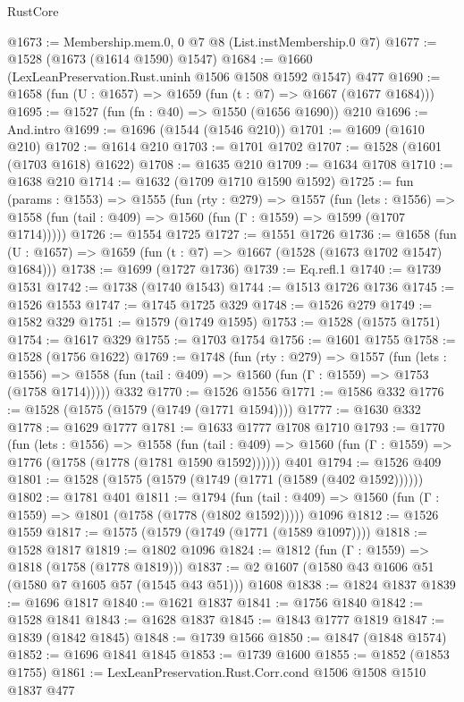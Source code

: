 \begin{lexlean}{RustCore}
\begin{coremodule}
@1673 := Membership.mem.{0, 0} @7 @8 (List.instMembership.{0} @7)
@1677 := @1528 (@1673 (@1614 @1590) @1547)
@1684 := @1660 (LexLeanPreservation.Rust.uninh @1506 @1508 @1592 @1547) @477
@1690 := @1658 (fun (U : @1657) => @1659 (fun (t : @7) => @1667 (@1677 @1684)))
@1695 := @1527 (fun (fn : @40) => @1550 (@1656 @1690)) @210
@1696 := And.intro
@1699 := @1696 (@1544 (@1546 @210))
@1701 := @1609 (@1610 @210)
@1702 := @1614 @210
@1703 := @1701 @1702
@1707 := @1528 (@1601 (@1703 @1618) @1622)
@1708 := @1635 @210
@1709 := @1634 @1708
@1710 := @1638 @210
@1714 := @1632 (@1709 @1710 @1590 @1592)
@1725 := fun (params : @1553) =>
  @1555
    (fun (rty : @279) =>
    @1557
      (fun (lets : @1556) =>
      @1558 (fun (tail : @409) => @1560 (fun (Γ : @1559) => @1599 (@1707 @1714)))))
@1726 := @1554 @1725
@1727 := @1551 @1726
@1736 := @1658 (fun (U : @1657) => @1659 (fun (t : @7) => @1667 (@1528 (@1673 @1702 @1547) @1684)))
@1738 := @1699 (@1727 @1736)
@1739 := Eq.refl.{1}
@1740 := @1739 @1531
@1742 := @1738 (@1740 @1543)
@1744 := @1513 @1726 @1736
@1745 := @1526 @1553
@1747 := @1745 @1725 @329
@1748 := @1526 @279
@1749 := @1582 @329
@1751 := @1579 (@1749 @1595)
@1753 := @1528 (@1575 @1751)
@1754 := @1617 @329
@1755 := @1703 @1754
@1756 := @1601 @1755
@1758 := @1528 (@1756 @1622)
@1769 := @1748
    (fun (rty : @279) =>
    @1557
      (fun (lets : @1556) =>
      @1558 (fun (tail : @409) => @1560 (fun (Γ : @1559) => @1753 (@1758 @1714)))))
    @332
@1770 := @1526 @1556
@1771 := @1586 @332
@1776 := @1528 (@1575 (@1579 (@1749 (@1771 @1594))))
@1777 := @1630 @332
@1778 := @1629 @1777
@1781 := @1633 @1777 @1708 @1710
@1793 := @1770
    (fun (lets : @1556) =>
    @1558
      (fun (tail : @409) => @1560 (fun (Γ : @1559) => @1776 (@1758 (@1778 (@1781 @1590 @1592))))))
    @401
@1794 := @1526 @409
@1801 := @1528 (@1575 (@1579 (@1749 (@1771 (@1589 (@402 @1592))))))
@1802 := @1781 @401
@1811 := @1794
    (fun (tail : @409) => @1560 (fun (Γ : @1559) => @1801 (@1758 (@1778 (@1802 @1592)))))
    @1096
@1812 := @1526 @1559
@1817 := @1575 (@1579 (@1749 (@1771 (@1589 @1097))))
@1818 := @1528 @1817
@1819 := @1802 @1096
@1824 := @1812 (fun (Γ : @1559) => @1818 (@1758 (@1778 @1819)))
@1837 := @2 @1607 (@1580 @43 @1606 @51 (@1580 @7 @1605 @57 (@1545 @43 @51))) @1608
@1838 := @1824 @1837
@1839 := @1696 @1817
@1840 := @1621 @1837
@1841 := @1756 @1840
@1842 := @1528 @1841
@1843 := @1628 @1837
@1845 := @1843 @1777 @1819
@1847 := @1839 (@1842 @1845)
@1848 := @1739 @1566
@1850 := @1847 (@1848 @1574)
@1852 := @1696 @1841 @1845
@1853 := @1739 @1600
@1855 := @1852 (@1853 @1755)
@1861 := LexLeanPreservation.Rust.Corr.cond @1506 @1508 @1510 @1837 @477

\end{coremodule}
\end{lexlean}
